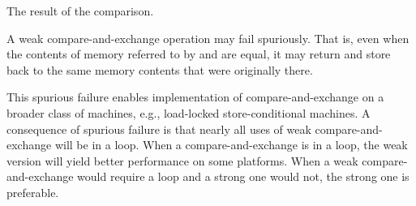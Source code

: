 \begin{itemdescr}
\begin{removedblock}
\pnum
\returns The result of the comparison.
\end{removedblock}

\pnum
\remarks A weak compare-and-exchange operation may fail spuriously.
That is, even when the contents of memory referred to
by  and  are equal,
it may return  and
store back to  the same memory contents
that were originally there.
\begin{note}
This spurious failure enables implementation of compare-and-exchange
on a broader class of machines, e.g., load-locked store-conditional machines.
A consequence of spurious failure is
that nearly all uses of weak compare-and-exchange will be in a loop.
When a compare-and-exchange is in a loop,
the weak version will yield better performance on some platforms.
When a weak compare-and-exchange would require a loop and
a strong one would not, the strong one is preferable.
\end{note}
\end{itemdescr}

~\\
~\\

 \\

